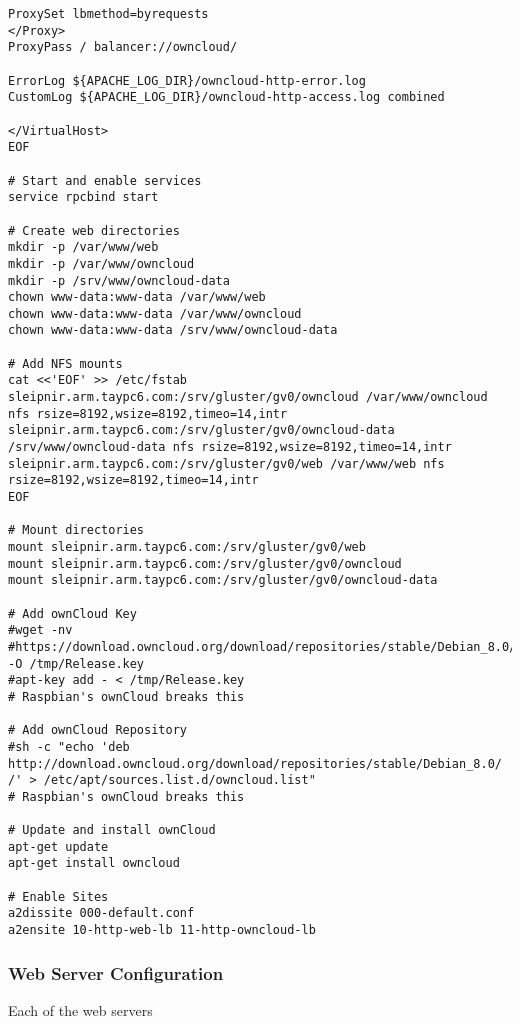 \documentclass[12pt]{spieman}  %
\begin{document}
\begin{lstlisting}
ProxySet lbmethod=byrequests
</Proxy>
ProxyPass / balancer://owncloud/

ErrorLog ${APACHE_LOG_DIR}/owncloud-http-error.log
CustomLog ${APACHE_LOG_DIR}/owncloud-http-access.log combined

</VirtualHost>
EOF

# Start and enable services
service rpcbind start

# Create web directories
mkdir -p /var/www/web
mkdir -p /var/www/owncloud
mkdir -p /srv/www/owncloud-data
chown www-data:www-data /var/www/web
chown www-data:www-data /var/www/owncloud
chown www-data:www-data /srv/www/owncloud-data

# Add NFS mounts
cat <<'EOF' >> /etc/fstab
sleipnir.arm.taypc6.com:/srv/gluster/gv0/owncloud /var/www/owncloud nfs rsize=8192,wsize=8192,timeo=14,intr
sleipnir.arm.taypc6.com:/srv/gluster/gv0/owncloud-data /srv/www/owncloud-data nfs rsize=8192,wsize=8192,timeo=14,intr
sleipnir.arm.taypc6.com:/srv/gluster/gv0/web /var/www/web nfs rsize=8192,wsize=8192,timeo=14,intr
EOF

# Mount directories
mount sleipnir.arm.taypc6.com:/srv/gluster/gv0/web
mount sleipnir.arm.taypc6.com:/srv/gluster/gv0/owncloud
mount sleipnir.arm.taypc6.com:/srv/gluster/gv0/owncloud-data

# Add ownCloud Key
#wget -nv #https://download.owncloud.org/download/repositories/stable/Debian_8.0/Release.key -O /tmp/Release.key
#apt-key add - < /tmp/Release.key
# Raspbian's ownCloud breaks this

# Add ownCloud Repository
#sh -c "echo 'deb http://download.owncloud.org/download/repositories/stable/Debian_8.0/ /' > /etc/apt/sources.list.d/owncloud.list"
# Raspbian's ownCloud breaks this

# Update and install ownCloud
apt-get update
apt-get install owncloud

# Enable Sites
a2dissite 000-default.conf
a2ensite 10-http-web-lb 11-http-owncloud-lb
\end{lstlisting}

\subsubsection{Web Server Configuration}
\label{subsubsec:web-config}

Each of the web servers
\end{document}
